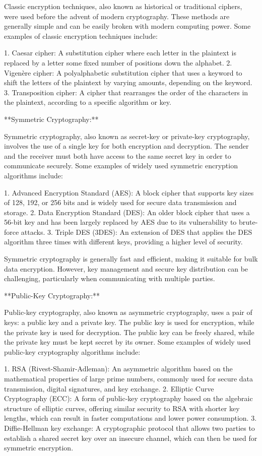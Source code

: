 \documentclass{article}
\begin{document}
Classic encryption techniques, also known as historical or traditional ciphers, were used before the advent of modern cryptography. These methods are generally simple and can be easily broken with modern computing power. Some examples of classic encryption techniques include:

1. Caesar cipher: A substitution cipher where each letter in the plaintext is replaced by a letter some fixed number of positions down the alphabet.
2. Vigenère cipher: A polyalphabetic substitution cipher that uses a keyword to shift the letters of the plaintext by varying amounts, depending on the keyword.
3. Transposition cipher: A cipher that rearranges the order of the characters in the plaintext, according to a specific algorithm or key.

**Symmetric Cryptography:**

Symmetric cryptography, also known as secret-key or private-key cryptography, involves the use of a single key for both encryption and decryption. The sender and the receiver must both have access to the same secret key in order to communicate securely. Some examples of widely used symmetric encryption algorithms include:

1. Advanced Encryption Standard (AES): A block cipher that supports key sizes of 128, 192, or 256 bits and is widely used for secure data transmission and storage.
2. Data Encryption Standard (DES): An older block cipher that uses a 56-bit key and has been largely replaced by AES due to its vulnerability to brute-force attacks.
3. Triple DES (3DES): An extension of DES that applies the DES algorithm three times with different keys, providing a higher level of security.

Symmetric cryptography is generally fast and efficient, making it suitable for bulk data encryption. However, key management and secure key distribution can be challenging, particularly when communicating with multiple parties.

**Public-Key Cryptography:**

Public-key cryptography, also known as asymmetric cryptography, uses a pair of keys: a public key and a private key. The public key is used for encryption, while the private key is used for decryption. The public key can be freely shared, while the private key must be kept secret by its owner. Some examples of widely used public-key cryptography algorithms include:

1. RSA (Rivest-Shamir-Adleman): An asymmetric algorithm based on the mathematical properties of large prime numbers, commonly used for secure data transmission, digital signatures, and key exchange.
2. Elliptic Curve Cryptography (ECC): A form of public-key cryptography based on the algebraic structure of elliptic curves, offering similar security to RSA with shorter key lengths, which can result in faster computations and lower power consumption.
3. Diffie-Hellman key exchange: A cryptographic protocol that allows two parties to establish a shared secret key over an insecure channel, which can then be used for symmetric encryption.
\end{document}

